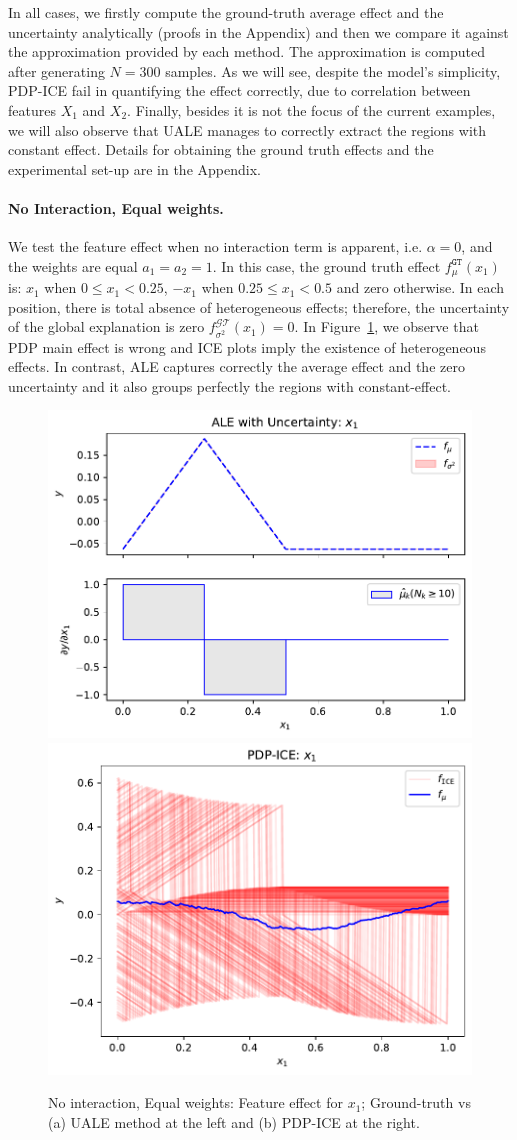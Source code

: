 \documentclass[twoside]{article}
\begin{document}
In all cases, we firstly compute the ground-truth average effect and
the uncertainty analytically (proofs in the Appendix) and then we
compare it against the approximation provided by each method. The
approximation is computed after generating \(N=300\) samples. As we
will see, despite the model's simplicity, PDP-ICE fail in quantifying
the effect correctly, due to correlation between features \(X_1\) and
\(X_2\). Finally, besides it is not the focus of the current examples,
we will also observe that UALE manages to correctly extract the
regions with constant effect. Details for obtaining the ground truth
effects and the experimental set-up are in the Appendix.

\paragraph{No Interaction, Equal weights.}

We test the feature effect when no interaction term is apparent,
i.e. \(\alpha=0\), and the weights are equal \(a_1=a_2=1\).  In this
case, the ground truth effect \(f_\mu^{\mathtt{GT}}(x_1)\) is: \(x_1\)
when \(0 \leq x_1 < 0.25\), \(-x_1\) when \(0.25 \leq x_1 < 0.5\) and
zero otherwise. In each position, there is total absence of
heterogeneous effects; therefore, the uncertainty of the global
explanation is zero \(f^{\mathcal{GT}}_{\sigma^2}(x_1) = 0\). In
Figure~\ref{fig:synth-ex-1-case-1}, we observe that PDP main effect is
wrong and ICE plots imply the existence of heterogeneous effects. In
contrast, ALE captures correctly the average effect and the zero
uncertainty and it also groups perfectly the regions with
constant-effect.

\begin{figure}[h]
  \centering
  \includegraphics[width=.23\textwidth]{example_1/dale_feat_0.pdf}
  \includegraphics[width=.23\textwidth]{example_1/pdp_ice_feat_0.pdf}
  \caption{No interaction, Equal weights: Feature effect for \(x_1\);
    Ground-truth vs (a) UALE method at the left and (b) PDP-ICE at the
    right.}
  \label{fig:synth-ex-1-case-1}
\end{figure}
\end{document}
